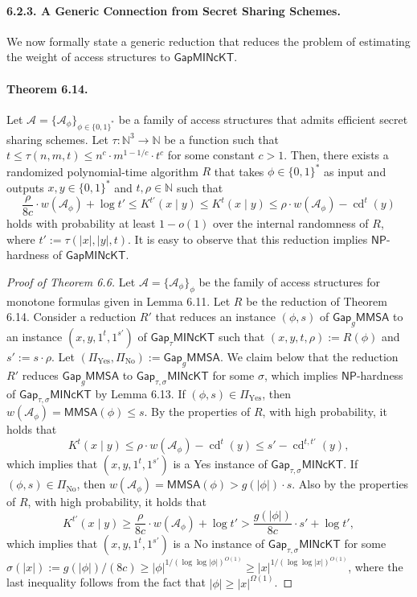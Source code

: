 \paragraph{6.2.3. A Generic Connection from Secret Sharing Schemes.}
We now formally state a generic reduction that reduces the problem of estimating the weight of access structures to $\mathsf{GapMINcKT}$.
\paragraph{Theorem 6.14.}
Let $\mathcal A=\{\mathcal A_\phi\}_{\phi\in\{0,1\}^*}$ be a family of access structures that admits efficient secret sharing schemes. Let $\tau:\mathbb N^3\to\mathbb N$ be a function such that $t\leq\tau(n,m,t)\leq n^c\cdot m^{1-1/c}\cdot t^c$ for some constant $c>1$. Then, there exists a randomized polynomial-time algorithm $R$ that takes $\phi\in\{0,1\}^*$ as input and outputs $x,y\in\{0,1\}^*$ and $t,\rho\in\mathbb N$ such that
\[\frac\rho{8c}\cdot w(\mathcal A_\phi)+\log t'\leq K^{t'}(x\mid y)\leq K^t(x\mid y)\leq\rho\cdot w(\mathcal A_\phi)-\operatorname{cd}^t(y)\]
holds with probability at least $1-o(1)$ over the internal randomness of $R$, where $t':=\tau(|x|,|y|,t)$.
It is easy to observe that this reduction implies $\mathsf{NP}$-hardness of $\mathsf{GapMINcKT}$.
\begin{proof}[Proof of Theorem 6.6]
Let $\mathcal A=\{\mathcal A_\phi\}_\phi$ be the family of access structures for monotone formulas given in Lemma 6.11. Let $R$ be the reduction of Theorem 6.14. Consider a reduction $R'$ that reduces an instance $(\phi,s)$ of $\mathsf{Gap}_g\mathsf{MMSA}$ to an instance $(x,y,1^t,1^{s'})$ of $\mathsf{Gap}_{\tau}\mathsf{MINcKT}$ such that $(x,y,t,\rho):=R(\phi)$ and $s':=s\cdot\rho$.
Let $(\Pi_{\mathrm{Yes}},\Pi_{\mathrm{No}}):=\mathsf{Gap}_g\mathsf{MMSA}$. We claim below that the reduction $R'$ reduces $\mathsf{Gap}_g\mathsf{MMSA}$ to $\mathsf{Gap}_{\tau,\sigma}\mathsf{MINcKT}$ for some $\sigma$, which implies $\mathsf{NP}$-hardness of $\mathsf{Gap}_{\tau,\sigma}\mathsf{MINcKT}$ by Lemma 6.13. If $(\phi,s)\in\Pi_{\mathrm{Yes}}$, then $w(\mathcal A_\phi)=\mathsf{MMSA}(\phi)\leq s$. By the properties of $R$, with high probability, it holds that
\[K^t(x\mid y)\leq\rho\cdot w(\mathcal A_\phi)-\operatorname{cd}^t(y)\leq s'-\operatorname{cd}^{t,t'}(y),\]
which implies that $(x,y,1^t,1^{s'})$ is a Yes instance of $\mathsf{Gap}_{\tau,\sigma}\mathsf{MINcKT}$. If $(\phi,s)\in\Pi_{\mathrm{No}}$, then $w(\mathcal A_\phi)=\mathsf{MMSA}(\phi)>g(|\phi|)\cdot s$. Also by the properties of $R$, with high probability, it holds that
\[K^{t'}(x\mid y)\geq\frac\rho{8c}\cdot w(\mathcal A_\phi)+\log t'>\frac{g(|\phi|)}{8c}\cdot s'+\log t',\]
which implies that $(x,y,1^t,1^{s'})$ is a No instance of $\mathsf{Gap}_{\tau,\sigma}\mathsf{MINcKT}$ for some $\sigma(|x|):=g(|\phi|)/(8c)\geq|\phi|^{1/(\log\log|\phi|)^{O(1)}}\geq|x|^{1/(\log\log|x|)^{O(1)}}$, where the last inequality follows from the fact that $|\phi|\geq|x|^{\Omega(1)}$.
\end{proof}
